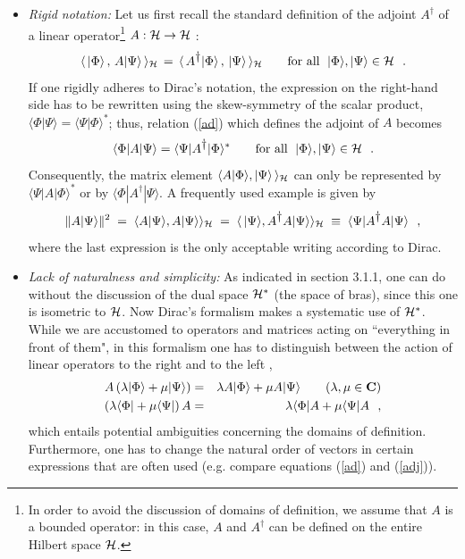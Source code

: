 \documentclass[a4wide,12pt]{report}
\begin{document}
\begin{itemize}
 
\item {\em Rigid notation:}
Let us first recall the standard definition of the 
adjoint $A^{\dag}$ of a linear operator\footnote{In order to avoid 
the discussion of domains of definition, we assume that $A$ is 
a bounded operator: in this case, $A$ and $A^{\dag}$ can  
be defined on the entire Hilbert space ${\cal H}$.}
$A : {\cal H} \to {\cal H}$ :
\begin{equation}
\label{ad}
\langle \, | \Phi \rangle \, , \, A | \Psi \rangle \, \rangle _{{\cal H}}
\, = \,
\langle \, A^{\displaystyle{\dagger}} | \Phi \rangle \, ,\, |\Psi \rangle \, \rangle _{{\cal H}}
\qquad 
\mbox{for all} \ \; 
|\Phi \rangle , |\Psi \rangle \in {\cal H} 
\ \ .
\end{equation}
 If one rigidly adheres to Dirac's notation, the 
expression on the right-hand side has to be 
rewritten using the skew-symmetry of the scalar product,
$\langle \Phi | \Psi \rangle =
\langle \Psi | \Phi \rangle ^{\ast}$; thus, relation
(\ref{ad}) which defines the adjoint of $A$ becomes 
\begin{equation}
\langle \Phi | A | \Psi \rangle  =
\langle \Psi | A^{\displaystyle{\dagger}} | \Phi \rangle ^{\ast}
\qquad \mbox{for all} \ \; 
|\Phi \rangle , |\Psi \rangle \in {\cal H} 
\ \ .
\label{adj}
\end{equation}
Consequently, the matrix element 
$\langle A | \Phi \rangle , | \Psi \rangle \, \rangle _{{\cal H}}$ 
can only be represented by 
$\langle \Psi | A | \Phi \rangle ^{\ast}$ or by 
$\langle \Phi | A^{\dag} | \Psi \rangle$.
A frequently used example is given by 
\[
\| A | \Psi \rangle \|^2 \; = \;
\langle A | \Psi \rangle , A | \Psi \rangle \rangle _{{\cal H}} \; =\;
\langle \, |\Psi \rangle ,A^{\displaystyle{\dagger}} A|\Psi \rangle \rangle _{{\cal H}}
 \; \equiv \; \langle \Psi |A^{\displaystyle{\dagger}} A |\Psi \rangle
\ \ ,
\]
where the last expression is the only acceptable writing according
to Dirac. 
 
\item
{\em Lack of naturalness and simplicity:}
As indicated in section 3.1.1, 
one can do without the discussion of the 
dual space ${\cal H}^{\ast}$ (the space of bras), 
since this one is isometric to ${\cal H}$. 
Now Dirac's formalism makes a systematic use of ${\cal H}^{\ast}$.
While we are accustomed to operators and matrices acting 
on ``everything in front of them", in this formalism 
one has to distinguish between the action of linear operators 
to the right and to the left
\cite{ct},
\begin{eqnarray}
A \left( \lambda | \Phi \rangle +  \mu | \Psi \rangle \right)
& = &
\lambda A | \Phi \rangle +  \mu A | \Psi \rangle
\qquad (\lambda , \mu \in {\bf C} )
\nonumber
\\
\label{aad}
\left( \lambda \langle \Phi | + \mu \langle \Psi | \right) A
& = &
\lambda \langle \Phi | A +
\mu \langle \Psi | A
\ \ ,
\end{eqnarray}
which entails potential ambiguities concerning the
domains of definition. 
Furthermore, one has to change the natural order of vectors 
in certain expressions that are often used 
(e.g. compare equations  (\ref{ad}) and (\ref{adj})). 
 

\end{itemize}
\end{document}
